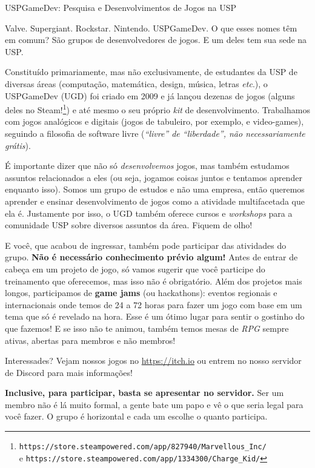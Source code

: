 \begin{subsecao}{USPGameDev: Pesquisa e Desenvolvimentos de Jogos na USP}


Valve. Supergiant. Rockstar. Nintendo. USPGameDev. O que esses nomes têm em
comum? São grupos de desenvolvedores de jogos. E um deles tem sua sede na USP.

Constituído primariamente, mas não exclusivamente, de estudantes da USP de
diversas áreas (computação, matemática, design, música, letras \textit{etc}.),
o USPGameDev (UGD) foi criado em 2009 e já lançou dezenas de jogos (alguns
deles no Steam!\footnote{\texttt{https://store.steampowered.com/app/827940/Marvellous\_Inc/}
\\ e \texttt{https://store.steampowered.com/app/1334300/Charge\_Kid/}}) e até
mesmo o seu próprio \textit{kit} de desenvolvimento. Trabalhamos com jogos
analógicos e digitais (jogos de tabuleiro, por exemplo, e video-games),
seguindo a filosofia de software livre (\textit{``livre'' de ``liberdade'',
não necessariamente grátis}).

É importante dizer que não só \textit{desenvolvemos} jogos, mas também
estudamos assuntos relacionados a eles (ou seja, jogamos coisas juntos e
tentamos aprender enquanto isso). Somos um grupo de estudos e não uma empresa,
então queremos aprender e ensinar desenvolvimento de jogos como a atividade
multifacetada que ela é. Justamente por isso, o UGD também oferece cursos e
\textit{workshops} para a comunidade USP sobre diversos assuntos da área.
Fiquem de olho!

E você, que acabou de ingressar, também pode participar das atividades do grupo.
\textbf{Não é necessário conhecimento prévio algum!} Antes de entrar de cabeça
em um projeto de jogo, só vamos sugerir que você participe do treinamento que
oferecemos, mas isso não é obrigatório. Além dos projetos mais longos,
participamos de \textbf{game jams} (ou hackathons): eventos regionais e
internacionais onde temos de 24 a 72 horas para fazer um jogo com base em um
tema que só é revelado na hora. Esse é um ótimo lugar para sentir o gostinho
do que fazemos! E se isso não te animou, também temos mesas de \textit{RPG}
sempre ativas, abertas para membros e não membros!

Interessades? Vejam nossos jogos no \url{https://itch.io} ou entrem no nosso servidor
de Discord para mais informações!

\textbf{Inclusive, para participar, basta se apresentar no servidor.} 
Ser um membro não é lá muito formal, a gente bate um papo e vê 
o que seria legal para você fazer. O grupo é horizontal e cada 
um escolhe o quanto participa.


\end{subsecao}

